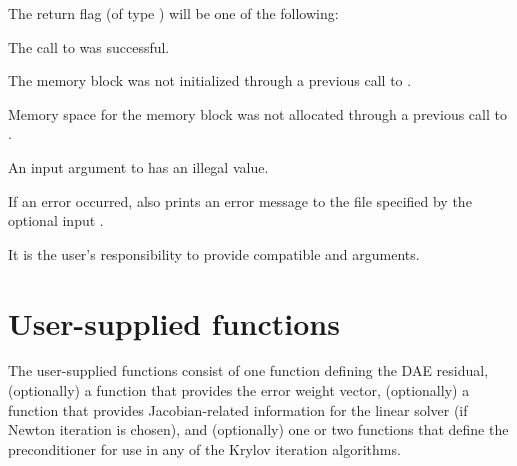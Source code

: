 {{}
{
  The return flag  (of type ) will be one of the following:
  \begin{args}
  \item[\Id{IDA\_SUCCESS}]
    The call to  was successful.
  \item[\Id{IDA\_MEM\_NULL}] 
    The {\ida} memory block was not initialized through a 
    previous call to .
  \item[\Id{IDA\_NO\_MALLOC}] 
    Memory space for the {\ida} memory block was not allocated through a 
    previous call to .
  \item[\Id{IDA\_ILL\_INPUT}] 
    An input argument to  has an illegal value.
  \end{args}
}
{
  If an error occurred,  also prints an error message to the
  file specified by the optional input .

  {\warn} It is the user's responsibility to provide compatible  and
   arguments.
}


\section{User-supplied functions}\label{ss:user_fct_sim}

The user-supplied functions consist of one function defining the DAE residual,
(optionally) a function that provides the error weight vector,
(optionally) a function that provides Jacobian-related information for the linear 
solver (if Newton iteration is chosen), and (optionally) one or two functions 
that define the preconditioner for use in any of the Krylov iteration algorithms.
}
